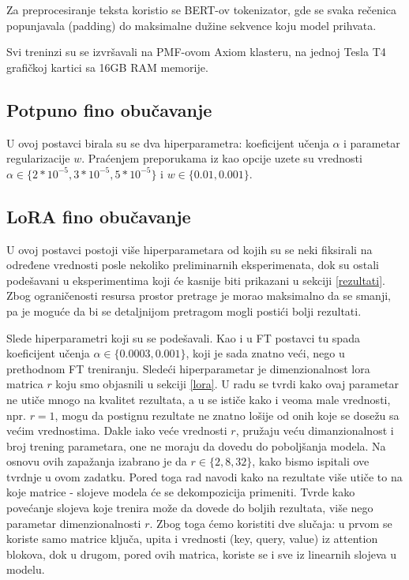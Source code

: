 \documentclass{article}
\theoremstyle{definition}
\begin{document}
	Za preprocesiranje teksta koristio se BERT-ov tokenizator, gde se svaka rečenica 
	popunjavala (padding) do maksimalne dužine sekvence koju model prihvata.

	Svi treninzi su se izvršavali na PMF-ovom Axiom klasteru, na jednoj Tesla T4
	grafičkoj kartici sa 16GB RAM memorije.

	\subsection{Potpuno fino obučavanje}
	U ovoj postavci birala su se dva hiperparametra: koeficijent učenja $\alpha$
	i parametar regularizacije $w$.	Praćenjem preporukama iz \cite{bert} 
	kao opcije uzete su vrednosti $\alpha \in \{2 * 10^{-5}, 3 * 10^{-5}, 
	5 * 10^{-5}\}$ i $w \in \{0.01, 0.001\}$.

	\subsection{LoRA fino obučavanje}
	U ovoj postavci postoji više hiperparametara od kojih su se neki fiksirali
	na određene vrednosti posle nekoliko preliminarnih eksperimenata, dok su 
	ostali podešavani u eksperimentima koji će kasnije biti prikazani u sekciji
	\ref{rezultati}. Zbog ograničenosti resursa prostor pretrage je morao
	maksimalno da se smanji, pa je moguće da bi se detaljnijom pretragom mogli
	postići bolji rezultati.

	Slede hiperparametri koji su se podešavali. Kao i u FT postavci tu spada
	koeficijent učenja $\alpha \in \{0.0003, 0.001\}$, koji je sada znatno veći,
	nego u prethodnom FT treniranju. Sledeći hiperparametar je dimenzionalnost lora 
	matrica $r$ koju smo objasnili u sekciji \ref{lora}. U radu \cite{qlora} se
	tvrdi kako ovaj parametar ne utiče mnogo na kvalitet rezultata, a u 
	\cite{lora} se ističe kako i veoma male vrednosti, npr. $r=1$, mogu da 
	postignu rezultate ne znatno lošije od onih koje se dosežu sa većim vrednostima. 
	Dakle iako veće vrednosti $r$, pružaju veću dimanzionalnost i broj trening
	parametara, one ne moraju da dovedu do poboljšanja modela. 
	Na osnovu ovih zapažanja izabrano je da $r \in \{2, 8, 32\}$, kako bismo
	ispitali ove tvrdnje u ovom zadatku. Pored toga rad \cite{qlora} navodi kako
	na rezultate više utiče to na koje matrice - slojeve modela će se dekompozicija
	primeniti. Tvrde kako povećanje slojeva koje trenira može da dovede do boljih
	rezultata, više nego parametar dimenzionalnosti $r$. Zbog toga ćemo koristiti
	dve slučaja: u prvom se koriste samo matrice ključa, upita i vrednosti (key, 
	query, value) iz attention blokova, dok u drugom, pored ovih matrica, koriste 
	se i sve iz linearnih slojeva u modelu.
\end{document}
